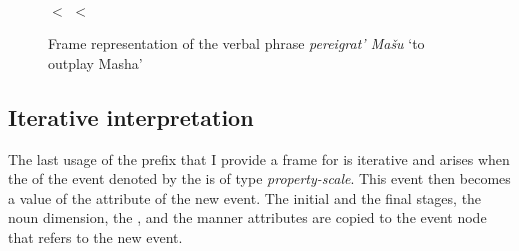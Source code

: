 \begin{figure}
\begin{minipage}{0.55\textwidth}
\end{minipage}\hfill%
\begin{minipage}{0.4\textwidth}\centering
{}\\
 $<$  $<$ 
\end{minipage}
\caption{Frame representation of the verbal phrase \textit{pereigrat' Ma\v{s}u} `to outplay Masha' \label{frame:outplay:Masha}}
\end{figure}

\subsection{Iterative interpretation}
The last usage of the prefix  that I provide a frame for is iterative and arises when the  of the event denoted by the  is of type \textit{property-scale}. This event then becomes a value of the  attribute of the new event. The initial and the final stages, the noun dimension, the , and the manner attributes are copied to the event node that refers to the new event. 

